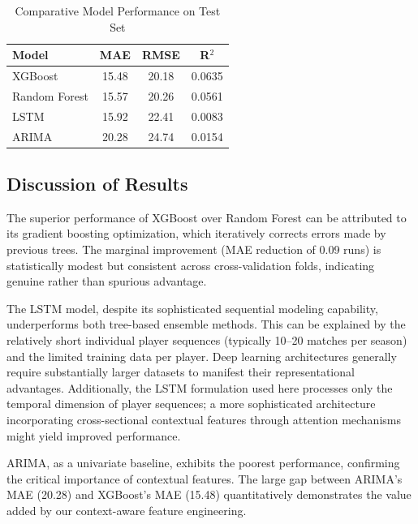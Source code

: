 \documentclass[conference]{IEEEtran}
\begin{document}
\begin{table}[htbp]
\centering
\caption{Comparative Model Performance on Test Set}
\label{tab:results}
\begin{tabular}{lccc}
\toprule
\textbf{Model} & \textbf{MAE} & \textbf{RMSE} & \textbf{R\(^2\)} \\
\midrule
XGBoost & 15.48 & 20.18 & 0.0635 \\
Random Forest & 15.57 & 20.26 & 0.0561 \\
LSTM & 15.92 & 22.41 & 0.0083 \\
ARIMA & 20.28 & 24.74 & 0.0154 \\
\bottomrule
\end{tabular}
\end{table}

\subsection{Discussion of Results}
The superior performance of XGBoost over Random Forest can be attributed to its gradient boosting optimization, which iteratively corrects errors made by previous trees. The marginal improvement (MAE reduction of 0.09 runs) is statistically modest but consistent across cross-validation folds, indicating genuine rather than spurious advantage.

The LSTM model, despite its sophisticated sequential modeling capability, underperforms both tree-based ensemble methods. This can be explained by the relatively short individual player sequences (typically 10–20 matches per season) and the limited training data per player. Deep learning architectures generally require substantially larger datasets to manifest their representational advantages. Additionally, the LSTM formulation used here processes only the temporal dimension of player sequences; a more sophisticated architecture incorporating cross-sectional contextual features through attention mechanisms might yield improved performance.

ARIMA, as a univariate baseline, exhibits the poorest performance, confirming the critical importance of contextual features. The large gap between ARIMA's MAE (20.28) and XGBoost's MAE (15.48) quantitatively demonstrates the value added by our context-aware feature engineering.
\end{document}
